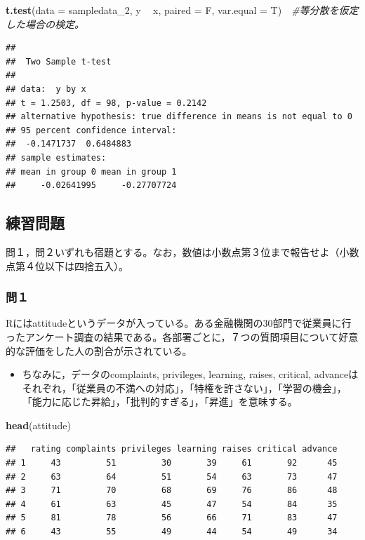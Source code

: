 \documentclass[]{article}
\newenvironment{Shaded}{\begin{snugshade}}{\end{snugshade}}
\newcommand{\KeywordTok}[1]{\textcolor[rgb]{0.13,0.29,0.53}{\textbf{#1}}}
\newcommand{\DataTypeTok}[1]{\textcolor[rgb]{0.13,0.29,0.53}{#1}}
\newcommand{\DecValTok}[1]{\textcolor[rgb]{0.00,0.00,0.81}{#1}}
\newcommand{\StringTok}[1]{\textcolor[rgb]{0.31,0.60,0.02}{#1}}
\newcommand{\CommentTok}[1]{\textcolor[rgb]{0.56,0.35,0.01}{\textit{#1}}}
\newcommand{\OperatorTok}[1]{\textcolor[rgb]{0.81,0.36,0.00}{\textbf{#1}}}
\newcommand{\NormalTok}[1]{#1}
\providecommand{\tightlist}{%
  \setlength{\itemsep}{0pt}\setlength{\parskip}{0pt}}
\begin{document}
\begin{Shaded}
\begin{Highlighting}[]
\KeywordTok{t.test}\NormalTok{(}\DataTypeTok{data =}\NormalTok{ sampledata_}\DecValTok{2}\NormalTok{, y }\OperatorTok{~}\StringTok{ }\NormalTok{x, }\DataTypeTok{paired =}\NormalTok{ F, }\DataTypeTok{var.equal =}\NormalTok{ T)　}\CommentTok{#等分散を仮定した場合の検定。}
\end{Highlighting}
\end{Shaded}

\begin{verbatim}
## 
##  Two Sample t-test
## 
## data:  y by x
## t = 1.2503, df = 98, p-value = 0.2142
## alternative hypothesis: true difference in means is not equal to 0
## 95 percent confidence interval:
##  -0.1471737  0.6484883
## sample estimates:
## mean in group 0 mean in group 1 
##     -0.02641995     -0.27707724
\end{verbatim}

\subsection{練習問題}\label{-8}

問１，問２いずれも宿題とする。なお，数値は小数点第３位まで報告せよ（小数点第４位以下は四捨五入）。

\subsubsection{問１}\label{-17}

Rにはattitudeというデータが入っている。ある金融機関の30部門で従業員に行ったアンケート調査の結果である。各部署ごとに，７つの質問項目について好意的な評価をした人の割合が示されている。

\begin{itemize}
\tightlist
\item
  ちなみに，データのcomplaints, privileges, learning, raises, critical,
  advanceはそれぞれ，「従業員の不満への対応」，「特権を許さない」，「学習の機会」，「能力に応じた昇給」，「批判的すぎる」，「昇進」を意味する。
\end{itemize}

\begin{Shaded}
\begin{Highlighting}[]
\KeywordTok{head}\NormalTok{(attitude)}
\end{Highlighting}
\end{Shaded}

\begin{verbatim}
##   rating complaints privileges learning raises critical advance
## 1     43         51         30       39     61       92      45
## 2     63         64         51       54     63       73      47
## 3     71         70         68       69     76       86      48
## 4     61         63         45       47     54       84      35
## 5     81         78         56       66     71       83      47
## 6     43         55         49       44     54       49      34
\end{verbatim}
\end{document}
